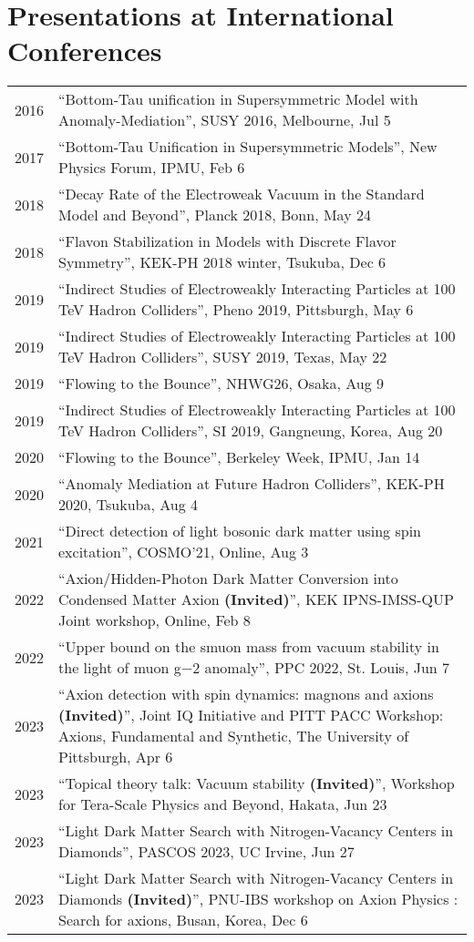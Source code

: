 \documentclass[12pt]{article}
\begin{document}
\section*{Presentations at International Conferences}
\begin{table}[H]\begin{tabular}{lp{6in}}2016 & ``Bottom-Tau unification in Supersymmetric Model with Anomaly-Mediation'', SUSY 2016, Melbourne, Jul 5 \\2017 & ``Bottom-Tau Unification in Supersymmetric Models'', New Physics Forum, IPMU, Feb 6 \\2018 & ``Decay Rate of the Electroweak Vacuum in the Standard Model and Beyond'', Planck 2018, Bonn, May 24 \\2018 & ``Flavon Stabilization in Models with Discrete Flavor Symmetry'', KEK-PH 2018 winter, Tsukuba, Dec 6 \\2019 & ``Indirect Studies of Electroweakly Interacting Particles at 100 TeV Hadron Colliders'', Pheno 2019, Pittsburgh, May 6 \\2019 & ``Indirect Studies of Electroweakly Interacting Particles at 100 TeV Hadron Colliders'', SUSY 2019, Texas, May 22 \\2019 & ``Flowing to the Bounce'', NHWG26, Osaka, Aug 9 \\2019 & ``Indirect Studies of Electroweakly Interacting Particles at 100 TeV Hadron Colliders'', SI 2019, Gangneung, Korea, Aug 20 \\2020 & ``Flowing to the Bounce'', Berkeley Week, IPMU, Jan 14 \\2020 & ``Anomaly Mediation at Future Hadron Colliders'', KEK-PH 2020, Tsukuba, Aug 4 \\2021 & ``Direct detection of light bosonic dark matter using spin excitation'', COSMO'21, Online, Aug 3 \\2022 & ``Axion/Hidden-Photon Dark Matter Conversion into Condensed Matter Axion \textbf{(Invited)}'', KEK IPNS-IMSS-QUP Joint workshop, Online, Feb 8 \\2022 & ``Upper bound on the smuon mass from vacuum stability in the light of muon g−2 anomaly'', PPC 2022, St. Louis, Jun 7 \\2023 & ``Axion detection with spin dynamics: magnons and axions \textbf{(Invited)}'', Joint IQ Initiative and PITT PACC Workshop: Axions, Fundamental and Synthetic, The University of Pittsburgh, Apr 6 \\2023 & ``Topical theory talk: Vacuum stability \textbf{(Invited)}'', Workshop for Tera-Scale Physics and Beyond, Hakata, Jun 23 \\2023 & ``Light Dark Matter Search with Nitrogen-Vacancy Centers in Diamonds'', PASCOS 2023, UC Irvine, Jun 27 \\2023 & ``Light Dark Matter Search with Nitrogen-Vacancy Centers in Diamonds \textbf{(Invited)}'', PNU-IBS workshop on Axion Physics : Search for axions, Busan, Korea, Dec 6 \\\end{tabular}\end{table}
\end{document}
